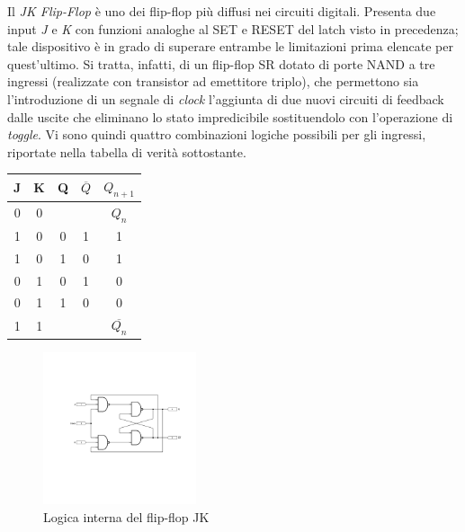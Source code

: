 \documentclass[journal]{IEEEtran}
\begin{document}
Il \textit{JK Flip-Flop} è uno dei  flip-flop più diffusi nei circuiti digitali. Presenta due input \textit{J} e \textit{K} con funzioni analoghe al SET e RESET del latch visto in precedenza; tale dispositivo è in grado di superare entrambe le limitazioni prima elencate per quest'ultimo. Si tratta, infatti, di un flip-flop SR dotato di porte NAND a tre ingressi (realizzate con transistor ad emettitore triplo), che permettono sia l'introduzione di un segnale di \textit{clock} l'aggiunta di due nuovi circuiti di feedback dalle uscite che eliminano lo stato impredicibile sostituendolo con l'operazione di \textit{toggle}. Vi sono quindi quattro combinazioni logiche possibili per gli ingressi, riportate nella tabella di verità sottostante.
\newline
\begin{center}
\begin{tabular}{ |c|c|c|c|c| } 
 \hline
 \rowcolor{lightgray}
 J & K & Q & $\overline{Q}$ & $ Q_{n + 1} $ \\ \hline \hline
 0 & 0 &  &  & $Q_n$ \\ \hline
 1 & 0 & 0 & 1 & 1 \\ \hline
 1 & 0 & 1 & 0 & 1\\ \hline
 0 & 1 & 0 & 1 & 0 \\ \hline
 0 & 1 & 1 & 0 & 0 \\ \hline
 1 & 1 &  & & $\overline{Q_n}$ \\ \hline
\end{tabular}
\end{center}

\begin{figure}[H]%
\centering
\begin{center}
\includegraphics[width=0.40\textwidth]{sch-simulations/digital/output/flip-flop-JK.pdf}
\end{center}
\caption{Logica interna del flip-flop JK}
\label{fig:circuit_JK}
\end{figure}
\end{document}
